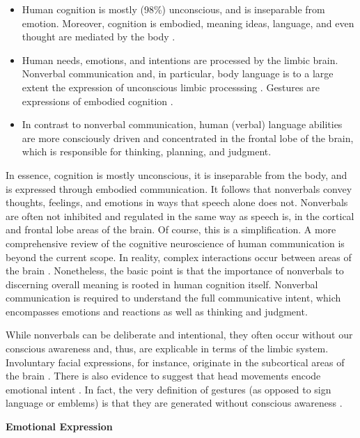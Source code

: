 \begin{itemize}
\item Human cognition is mostly (98\%) unconscious, and is inseparable from emotion. Moreover, cognition is embodied, meaning ideas, language, and even thought are mediated by the body \citep{Lakoff2010a}. 
\item Human needs, emotions, and intentions are processed by the limbic brain. Nonverbal communication and, in particular, body language is to a large extent the expression of unconscious limbic processsing \citep{Navarro2008,T.Lamendella1977}. Gestures are expressions of embodied cognition \citep{Kinsbourne2006}.
\item In contrast to nonverbal communication, human (verbal) language abilities are more consciously driven and concentrated in the frontal lobe of the brain, which is responsible for thinking, planning, and judgment.     
\end{itemize}

In essence, cognition is mostly unconscious, it is inseparable from the body, and is expressed through embodied communication. It follows that nonverbals convey thoughts, feelings, and emotions in ways that speech alone does not. Nonverbals are often not inhibited and regulated in the same way as speech is, in the cortical and frontal lobe areas of the brain. Of course, this is a simplification. A more comprehensive review of the cognitive neuroscience of human communication is beyond the current scope. In reality, complex interactions occur between areas of the brain \citep[32]{Wood2005}. Nonetheless, the basic point is that the importance of nonverbals to discerning overall meaning is rooted in human cognition itself. Nonverbal communication is required to understand the full communicative intent, which encompasses emotions and reactions as well as thinking and judgment. 
 
While nonverbals can be deliberate and intentional, they often occur without our conscious awareness and, thus, are explicable in terms of the limbic system. Involuntary facial expressions, for instance, originate in the subcortical areas of the brain \citep[36]{Matsumoto2013}. There is also evidence to suggest that head movements encode emotional intent \citep{Livingstone2016a}. In fact, the very definition of gestures (as opposed to sign language or emblems) is that they are generated without conscious awareness \citep[9]{Beattie2016}.

\textbf{Emotional Expression}

